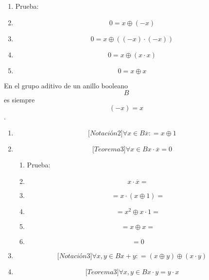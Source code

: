 \begin{enumerate}
\begin{enumerate}
\begin{enumerate}
\begin{enumerate}
        \begin{enumerate}
        \def\labelenumv{\arabic{enumv}.}
        \tightlist
        \item
          Prueba:
        \item
          \[{0 = x} \oplus \left( {- x} \right)\]
        \item
          \[{0 = x} \oplus \left( {\left( {- x} \right) \cdot \left( {- x} \right)} \right)\]
        \item
          \[{0 = x} \oplus \left( {x \cdot x} \right)\]
        \item
          \[{0 = x} \oplus x\]
        \end{enumerate}
      \end{enumerate}

      En el grupo aditivo de un anillo booleano \[B\] es siempre
      \[\left( {- x} \right) = x\].

      \begin{enumerate}
      \def\labelenumiv{\arabic{enumiv}.}
      \setcounter{enumiv}{39}
      \item
        \[{\lbrack{{Notación}2}\rbrack}\forall{x \in B}\overline{x}{: = x} \oplus 1\]
      \item
        \[{\lbrack{{Teorema}3}\rbrack}\forall{x \in B}{{x \cdot \overline{x}} = 0}\]

        \begin{enumerate}
        \def\labelenumv{\arabic{enumv}.}
        \tightlist
        \item
          Prueba:
        \item
          \[{x \cdot \overline{x}} =\]
        \item
          \[{= {x \cdot \left( {x \oplus 1} \right)}} =\]
        \item
          \[{= {x^{2} \oplus {x \cdot 1}}} =\]
        \item
          \[{= {x \oplus x}} =\]
        \item
          \[= 0\]
        \end{enumerate}
      \item
        \[{\lbrack{{Notación}3}\rbrack}\forall x,{y \in B}{x + y}{: = \left( {x \oplus y} \right)} \oplus \left( {x \cdot y} \right)\]
      \item
        \[{\lbrack{{Teorema}3}\rbrack}\forall x,{y \in B}{{x \cdot y} = {y \cdot x}}\]


\end{enumerate}
\end{enumerate}
\end{enumerate}
\end{enumerate}
